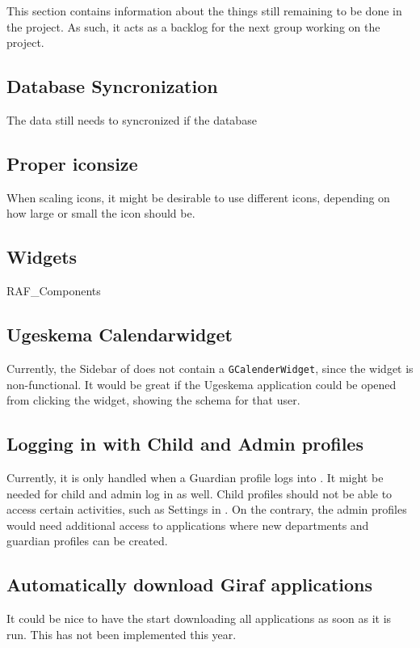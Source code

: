 This section contains information about the things still remaining to be done in the \launcher project.
As such, it acts as a backlog for the next group working on the project.

\subsection{Database Syncronization}
The data still needs to syncronized if the database

\subsection{Proper iconsize}
When scaling icons, it might be desirable to use different icons, depending on how large or small the icon should be.

\subsection{Widgets}
RAF\_Components

\subsection{Ugeskema Calendarwidget}
Currently, the Sidebar of \launcher does not contain a \lstinline!GCalenderWidget!, since the widget is non-functional.
It would be great if the Ugeskema application could be opened from clicking the widget, showing the schema for that user.

\subsection{Logging in with Child and Admin profiles}
Currently, it is only handled when a Guardian profile logs into \launcher.
It might be needed for child and admin log in as well.
Child profiles should not be able to access certain activities, such as Settings in \launcher.
On the contrary, the admin profiles would need additional access to applications where new departments and guardian profiles can be created.

\subsection{Automatically download Giraf applications}
It could be nice to have the \launcher start downloading all \giraf applications as soon as it is run.
This has not been implemented this year.

